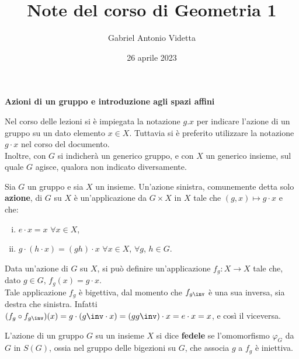 \documentclass[11pt]{article}
\title{\textbf{Note del corso di Geometria 1}}
\author{Gabriel Antonio Videtta}
\date{26 aprile 2023}
\begin{document}
	
	\maketitle
	
	\begin{center}
		\Large \textbf{Azioni di un gruppo e introduzione agli spazi affini}
	\end{center}

	
	\begin{note}
		Nel corso delle lezioni si è impiegata la notazione $g.x$ per indicare
		l'azione di un gruppo su un dato elemento $x \in X$. Tuttavia si è
		preferito utilizzare la notazione $g \cdot x$ nel corso del documento. \\
		
		Inoltre, con $G$ si indicherà un generico gruppo, e con $X$ un
		generico insieme, sul quale $G$ agisce, qualora non indicato diversamente.
	\end{note}

	\begin{definition} 
		Sia $G$ un gruppo e sia $X$ un insieme. Un'azione sinistra, comunemente detta solo \textbf{azione}, di $G$
		su $X$ è un'applicazione da $G \times X$ in $X$ tale
		che $(g, x) \mapsto g \cdot x$ e che:
		
		\begin{enumerate}[(i)]
			\item $e \cdot x = x$ $\forall x \in X$,
			\item $g \cdot (h \cdot x) = (gh) \cdot x$ $\forall x \in X$, $\forall g$, $h \in G$.
		\end{enumerate}
	\end{definition}

	\begin{remark}\nl
		\li Data un'azione di $G$ su $X$, si può definire un'applicazione
		$f_g : X \to X$ tale che, dato $g \in G$, $f_g(x) = g \cdot x$. \\
		\li Tale applicazione $f_g$ è bigettiva, dal momento che $f_{g\inv}$ è una sua
		inversa, sia destra che sinistra. Infatti $(f_g \circ f_{g\inv})(x) =
		g \cdot (g\inv \cdot x) = (g g\inv) \cdot x = e \cdot x = x$, e così il viceversa. 
	\end{remark}

	\begin{definition}
		L'azione di un gruppo $G$ su un insieme $X$ si dice \textbf{fedele} se
		l'omomorfismo $\varphi_G$ da $G$ in $S(G)$, ossia nel gruppo delle bigezioni su $G$, che
		associa $g$ a $f_g$ è iniettiva.
	\end{definition}
	
\end{document}

